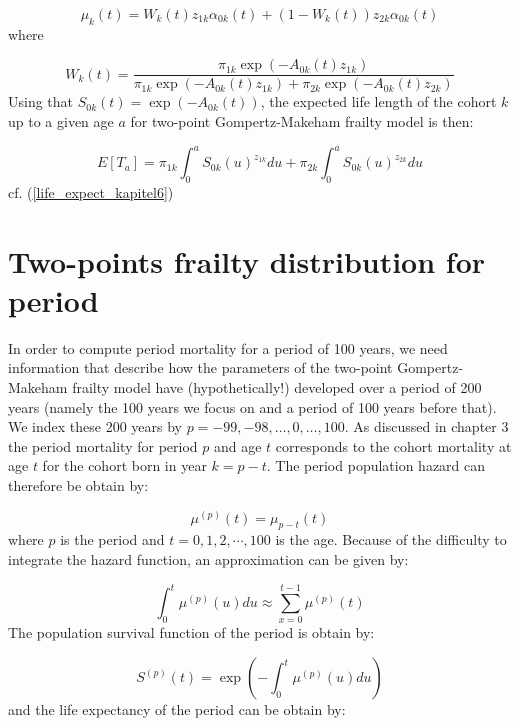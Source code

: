 \begin{equation}
      \mu_{k}(t) = W_{k}(t)z_{1k}\alpha_{0k}(t) + (1 - W_{k}(t))z_{2k}\alpha_{0k}(t)
    \label{deathIntensityPopulation3kap2}           
\end{equation}
where 


\begin{equation}
   W_{k}(t) = \frac{\pi_{1k}\exp(-A_{0k}(t)z_{1k})}{\pi_{1k}\exp(-A_{0k}(t)z_{1k}) + \pi_{2k}\exp(-A_{0k}(t)z_{2k}) }
   \label{deathIntensity population3kap6}
\end{equation}
Using that $ S_{0k}(t) = \exp(-A_{0k}(t)) $, the expected life length of the cohort $k$ up to a given age $a$ for two-point Gompertz-Makeham frailty model is then:


\begin{equation}
        E[T_{a}] = \pi_{1k}\int_{0}^{a} S_{0k}(u)^{z_{1k}}du + \pi_{2k}\int_{0}^{a} S_{0k}(u)^{z_{2k}}du 
\end{equation}
cf. (\ref{life_expect_kapitel6})


\section{Two-points frailty distribution for period} 

In order to compute period mortality for a period of 100 years, we need information that describe how the parameters of the two-point Gompertz-Makeham frailty model have (hypothetically!) developed over a period of 200 years (namely the 100 years we focus on and a period of 100 years before that). We index these 200 years by $p = -99, -98, \dots,0, \dots,100$.
As discussed in chapter 3 the period mortality for period $p$ and age $t$ corresponds to the cohort mortality at age $t$ for the cohort born in year $k = p-t $.
The period population hazard can therefore be obtain by:

\begin{equation}
    \mu^{(p)} (t) = \mu_{p-t}  (t)
\end{equation}
where $p$ is the period and $t = 0, 1, 2, \cdots , 100$ is the age.
Because of the difficulty to integrate the hazard function, an approximation can be given by:

\begin{equation}
    \int_{0}^{t} \mu^{(p)}(u) du \approx \sum\limits_{x=0}^{t-1} \mu^{(p)} (t)
\end{equation}
The population survival  function of the period is obtain by:
 
 \begin{equation}
     S^{(p)}(t) = \exp(-\int_{0}^{t} \mu^{(p)}(u)du )
 \end{equation}
and the life expectancy of the period can be obtain by:

